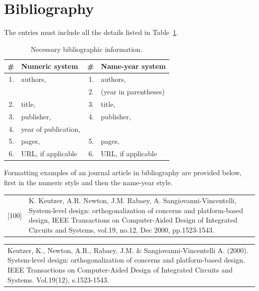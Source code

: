 \documentclass[12pt,a4paper,finnish]{tutthesis}
\begin{document}
\section{Bibliography}
The entries must include all the details listed in Table~\ref{tab:bibl}.
\begin{table}[!h]
  \small
  \begin{center}
    \caption{Necessary bibliographic information.}
    \label{tab:bibl}
    \begin{tabular}{r l | r l }
\hline 
\textbf{\#}  
   & \textbf{Numeric system}
                       & \textbf{\#}  
                                & \textbf{Name-year system}\\
\hline
\hline
1. &	authors,	   & 1. & authors,  \\
   &                       & 2. & (year in parentheses) \\
2. &	title,             & 3.	& title,    \\
3. &	publisher,         & 4.	& publisher,\\
4. &	year of publication, &  &	 \\
5. &	pages,             & 5.  & pages, \\
6. &	URL, if applicable & 6.	& URL, if applicable    \\
      \hline
    \end{tabular}
  \end{center}
\end{table}


Formatting examples of an journal article in bibliography are provided
below, first in the numeric style and then the name-year style.

\begin{tabular}{p{1cm}p{12cm}}
\small
[100] & K. Keutzer, A.R. Newton, J.M. Rabaey,
A. Sangiovanni-Vincentelli, System-level design: orthogonalization of
concerns and platform-based design, IEEE Transactions on
Computer-Aided Design of Integrated Circuits and Systems, vol.19,
no.12, Dec 2000, pp.1523-1543.\\
\end{tabular}

\begin{tabular}{p{13cm}}
\small
Keutzer, K., Newton, A.R., Rabaey, J.M. \& Sangiovanni-Vincentelli
A. (2000). System-level design: orthogonalization of concerns and
platform-based design. IEEE Transactions on Computer-Aided Design of
Integrated Circuits and Systems. Vol.19(12), s.1523-1543. \\
\end{tabular}
\end{document}
